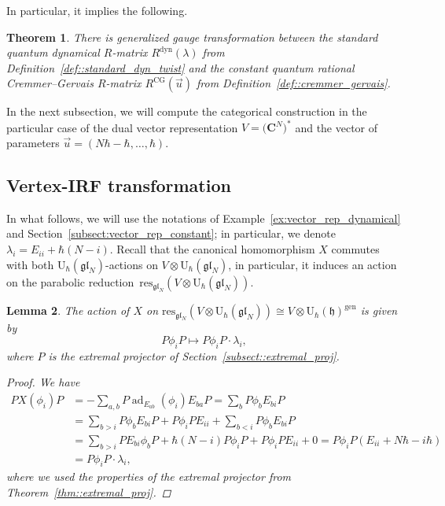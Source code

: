 \documentclass[10pt,a4paper]{amsart}
\numberwithin{equation}{section}
\newtheorem{Theorem}{Theorem}[section]
\newtheorem{Lemma}[Theorem]{Lemma}
\newcommand{\C}{\mathbf{C}}
\newcommand{\U}{\mathrm{U}_{\hbar}}
\newcommand{\h}{\mathfrak{h}}
\DeclareMathOperator{\ad}{ad}
\newcommand{\dyn}{\mathrm{dyn}}
\newcommand{\gen}{\mathrm{gen}}
\newcommand{\res}{\mathrm{res}}
\newcommand{\gl}{\mathfrak{gl}}
\begin{document}
	In particular, it implies the following.
	\begin{Theorem}
		\label{thm::the_vertex-irf}
		There is generalized gauge transformation between the standard quantum dynamical $R$-matrix $R^{\dyn}(\lambda)$ from Definition~{\rm\ref{def::standard_dyn_twist}} and the constant quantum rational Cremmer--Gervais $R$-matrix $R^{\mathrm{CG}}(\vec{u})$ from Definition~{\rm\ref{def::cremmer_gervais}}.
	\end{Theorem}
	
	In the next subsection, we will compute the categorical construction in the particular case of the dual vector representation $V = \bigl(\C^N\bigr)^*$ and the vector of parameters $\vec{u} = (N\hbar - \hbar,\dots,\hbar)$.
	
	\subsection{Vertex-IRF transformation}
	
	In what follows, we will use the notations of Example~\ref{ex:vector_rep_dynamical} and Section~\ref{subsect:vector_rep_constant}; in particular, we denote $\lambda_i = E_{ii} + \hbar(N-i)$. Recall that the canonical homomorphism $X$ commutes with both $\U(\gl_N)$-actions on $V \otimes \U(\gl_N)$, in particular, it induces an action on the parabolic reduction~$\res_{\gl_N}(V \otimes \U(\gl_N))$.
	
	\begin{Lemma}
		\label{lm:canonical_homomorphism_parabolic}
		The action of $X$ on $\res_{\gl_N}(V \otimes \U(\gl_N)) \cong V \otimes \U(\h)^{\gen}$ is given by
		\[
		P \phi_i P \mapsto P\phi_i P \cdot \lambda_i,
		\]
		where $P$ is the extremal projector of Section~{\rm\ref{subsect::extremal_proj}}.
		\begin{proof}
			We have
			\begin{align*}
				PX(\phi_i)P &= -\sum\limits_{a,b} P \ad_{E_{ab}}(\phi_i) E_{ba} P = \sum\limits_b P \phi_b E_{bi} P \\
&= \sum\limits_{b>i} P \phi_b E_{bi} P + P\phi_i P E_{ii} + \sum\limits_{b<i} P \phi_b E_{bi} P \\
				&= \sum\limits_{b>i} P E_{bi} \phi_b P +\hbar (N-i) P\phi_i P + P\phi_i P E_{ii} + 0 = P \phi_i P (E_{ii}+N\hbar - i\hbar) \\
				&= P\phi_i P \cdot \lambda_i,
			\end{align*}
			where we used the properties of the extremal projector from Theorem~\ref{thm::extremal_proj}.
		\end{proof}
	\end{Lemma}
	
\end{document}
